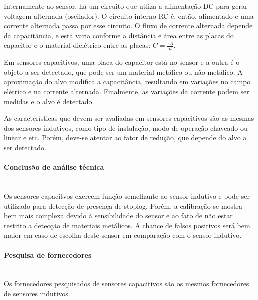 Internamente ao sensor, há um circuito que utliza a alimentação DC para gerar voltagem alternada (oscilador). O circuito interno RC é, então, alimentado e uma corrente alternada passa por esse circuito. O fluxo de corrente alternada depende da capacitância, e esta varia  conforme a distância e área entre as placas do capacitor e o material dielétrico entre as placas: $C = \frac{\epsilon A}{d}$.

Em sensores capacitivos, uma placa do capacitor está no sensor e a outra é o objeto a ser detectado, que pode ser um material metálico ou não-metálico. A aproximação do alvo modifica a capacitância, resultando em variações no campo elétrico e na corrente alternada. Finalmente, as variações da corrente podem ser medidas e o alvo é detectado.

As características que devem ser avaliadas em sensores capacitivos são as mesmas dos sensores indutivos, como tipo de instalação, modo de operação chaveado ou linear e etc. Porém, deve-se atentar ao fator de redução, que depende do alvo a ser detectado.

 \paragraph{Conclusão de análise técnica}\mbox{}\\
 Os sensores capacitvos exercem função semelhante ao sensor indutivo e pode ser utilizado para detecção de presença de stoplog. Porém, a calibração se mostra bem mais complexa devido à sensibilidade do sensor e ao fato de não estar restrito a detecção de materiais metálicos. A chance de falsos positivos será bem maior em caso de escolha deste sensor em comparação com o sensor indutivo.
 \paragraph{Pesquisa de fornecedores}\mbox{}\\
Os fornecedores pesquisados de sensores capacitivos são os mesmos fornecedores de sensores indutivos.

